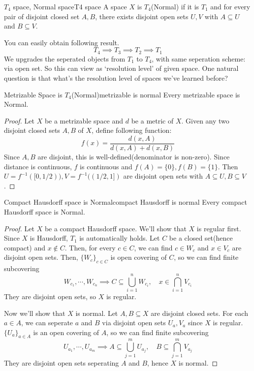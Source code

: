 \documentclass[12pt, a4paper, twoside]{article}
\theoremstyle{plain}
\begin{document}
\begin{defn}{$T_4$ space, Normal space}{T4 space}
    A space $X$ is $T_4$(Normal) if it is $T_1$ and for every pair of disjoint closed set $A, B$, there 
    exists disjoint open sets $U, V$ with $A \subseteq U$ and $B \subseteq V$. 
\end{defn}

You can easily obtain following result. 
\[T_4 \implies T_3 \implies T_2 \implies T_1\]
We upgrades the seperated objects from $T_1$ to $T_4$, with same seperation scheme: via open set. 
So this can view as \lq resolution level' of given space. 
One natural question is that what's the resolution level of spaces we've learned before? 

\begin{thm}{Metrizable Space is $T_4$(Normal)}{metrizable is normal}
    Every metrizable space is Normal. 
\end{thm}

\begin{proof}
    Let $X$ be a metrizable space and $d$ be a metric of $X$. 
    Given any two disjoint closed sets $A, B$ of $X$, define following function: 
    \[f(x) = \frac{d(x, A)}{d(x, A) + d(x, B)}\]
    Since $A, B$ are disjoint, this is well-defined(denominator is non-zero). 
    Since distance is continuous, $f$ is continuous and $f(A) = \{0\}, f(B) = \{1\}$. 
    Then $U = f^{-1}([0, 1/2)), V = f^{-1}((1/2, 1])$ are disjoint open sets with $A \subseteq U, B \subseteq V$. 
\end{proof}

\begin{thm}{Compact Hausdorff space is Normal}{compact Hausdorff is normal}
    Every compact Hausdorff space is Normal. 
\end{thm}

\begin{proof}
    Let $X$ be a compact Hausdorff space. We'll show that $X$ is regular first. 
    Since $X$ is Hausdorff, $T_1$ is automatically holds. 
    Let $C$ be a closed set(hence compact) and $x \notin C$. Then, for every $c \in C$, we can find 
    $c \in W_c$ and $x \in V_c$ are disjoint open sets. 
    Then, $\{W_c\}_{c \in C}$ is open covering of $C$, so we can find finite subcovering 
    \[W_{c_1}, \cdots, W_{c_n} \implies C \subseteq \bigcup_{i = 1}^{n} W_{c_i} , \quad x \in \bigcap_{i = 1}^{n} V_{c_i}\]
    They are disjoint open sets, so $X$ is regular. 

    Now we'll show that $X$ is normal. Let $A, B \subseteq X$ are disjoint closed sets. 
    For each $a \in A$, we can seperate $a$ and $B$ via disjoint open sets $U_a, V_a$ since $X$ is regular. 
    $\{U_a\}_{a \in A}$ is an open covering of $A$, so we can find finite subcovering 
    \[U_{a_1}, \cdots, U_{a_m} \implies A \subseteq \bigcup_{j = 1}^{m} U_{a_j}, \quad B \subseteq \bigcap_{j = 1}^{m} V_{a_j}\]
    They are disjoint open sets seperating $A$ and $B$, hence $X$ is normal. 
\end{proof}
\end{document}

